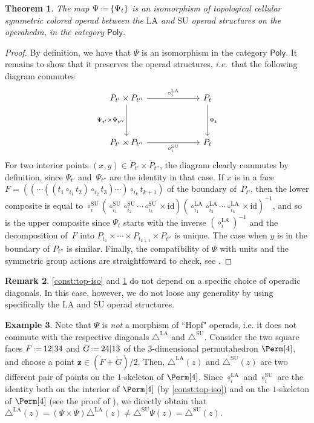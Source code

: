 \documentclass{amsart}
\newtheorem{theorem}{Theorem}[section]
\theoremstyle{definition}
\newtheorem{example}[theorem]{Example}
\newtheorem{remark}[theorem]{Remark}
\renewcommand{\b}[1]{{\boldsymbol{#1}}} %
\newcommand{\eqdef}{\mbox{\,\raisebox{0.2ex}{\scriptsize\ensuremath{\mathrm:}}\ensuremath{=}\,}} %
\newcommand{\ie}{\textit{i.e.}~} %
\renewcommand{\b}[1]{\boldsymbol{#1}} %
\newcommand{\SU}{\mathrm{SU}}
\newcommand{\LA}{\mathrm{LA}}
\newcommand{\SUD}{\triangle^{\mathrm{SU}}}
\newcommand{\LAD}{\triangle^{\mathrm{LA}}}
\newcommand{\PolySub}{\mathsf{Poly}}
\newcommand{\id}{\mathrm{id}}
\begin{document}
\begin{theorem}
	\label{thm:top-iso}
	The map $\Psi \eqdef \{\Psi_t\}$ is an isomorphism of topological cellular symmetric colored operad between the $\LA$ and $\SU$ operad structures on the operahedra, in the category $\PolySub$.
\end{theorem}

\begin{proof}
	By definition, we have that $\Psi$ is an isomorphism in the category $\PolySub$. 
	It remains to show that it preserves the operad structures, \ie that the following diagram commutes
	\[
	\vcenter{\hbox{
	\begin{tikzcd}[column sep=2.2cm, row sep=1.3cm]
	P_{t'}\times P_{t''}
	\arrow[r,  "\circ_i^\LA"] 
	\arrow[d,  "\Psi_{t'}\times\Psi_{t''}"']
	& P_{t} \arrow[d,  "\Psi_t"] \\
	P_{t'}\times P_{t''}  
	\arrow[r,  "\circ_i^\SU"']
	& P_{t}
	\end{tikzcd}
	}}\]
	For two interior points $(x,y) \in \mathring P_{t'}\times \mathring P_{t''}$, the diagram clearly commutes by definition, since $\Psi_{t'}$ and~$\Psi_{t''}$ are the identity in that case. 
	If $x$ is in a face $F=((\cdots((t_1 \circ_{i_1} t_2) \circ_{i_2} t_3) \cdots )\circ_{i_k} t_{k+1})$ of the boundary of~$P_{t'}$, then the lower composite is equal to $\circ_i^\SU (\circ_{i_1}^\SU \circ_{i_2}^\SU \cdots \circ_{i_k}^\SU \times \id)(\circ_{i_1}^\LA \circ_{i_2}^\LA \cdots \circ_{i_k}^\LA \times \id)^{-1}$, and so is the upper composite since $\Psi_t$ starts with the inverse $(\circ_i^\LA)^{-1}$ and the decomposition of~$F$ into $P_{t_1} \times \cdots \times P_{t_{k+1}} \times P_{t''}$ is unique.
	The case when $y$ is in the boundary of $P_{t''}$ is similar.  
	Finally, the compatibility of $\Psi$ with units and the symmetric group actions are straightfoward to check, see \cite[Def.~4.17 \& Thm.~4.18]{LaplanteAnfossi}.
\end{proof}

\begin{remark}
	\cref{const:top-iso} and \cref{thm:top-iso} do not depend on a specific choice of operadic diagonals.
	In this case, however, we do not loose any generality by using specifically the $\LA$ and $\SU$ operad structures. 
\end{remark}

\begin{example}
Note that $\Psi$ is \emph{not} a morphism of ``Hopf" operads, i.e. it does not commute with the respective diagonals $\LAD$ and $\SUD$. 
Consider the two square faces $F \eqdef 12|34$ and $G \eqdef 24|13$ of the $3$-dimensional permutahedron $\Perm[4]$, and choose a point $\b z \in (\mathring F + \mathring G)/2$.
Then, $\LAD(z)$ and $\SUD(z)$ are two different pair of points on the $1$-skeleton of $\Perm[4]$. 
Since $\circ_i^\LA$ and $\circ_i^\SU$ are the identity both on the interior of $\Perm[4]$ (by \cref{const:top-iso}) and on the $1$-skeleton of $\Perm[4]$ (see the proof of \cite[Prop. 7]{MasudaThomasTonksVallette}), we directly obtain that $\LAD(z)=(\Psi \times \Psi)\LAD(z) \neq \SUD \Psi(z)=\SUD(z)$. 
\end{example}
\end{document}
